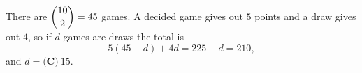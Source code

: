 There are $\dbinom{10}{2}=45$ games. A decided game gives out $5$ points and a draw gives out $4$, so if $d$ games are draws the total is
\[
5(45-d)+4d=225-d=210 ,
\]
and $d=\boxed{\textbf{(C)}\ 15}$.

